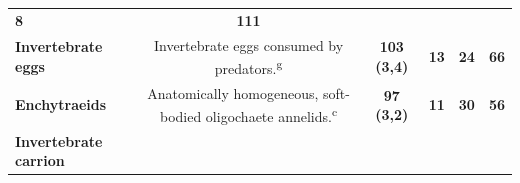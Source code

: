\documentclass[10pt,oneside]{article}
\begin{document}
\begin{longtable}[]{@{}lccccc@{}}
\begin{minipage}[t]{0.04\columnwidth}
\textbf{8}\strut
\end{minipage} & \begin{minipage}[t]{0.04\columnwidth}\centering
\textbf{111}\strut
\end{minipage}\tabularnewline
\begin{minipage}[t]{0.11\columnwidth}\raggedright
\textbf{Invertebrate eggs}\strut
\end{minipage} & \begin{minipage}[t]{0.45\columnwidth}\centering
Invertebrate eggs consumed by predators.\textsuperscript{g}\strut
\end{minipage} & \begin{minipage}[t]{0.14\columnwidth}\centering
\textbf{103 (3,4)}\strut
\end{minipage} & \begin{minipage}[t]{0.04\columnwidth}\centering
\textbf{13}\strut
\end{minipage} & \begin{minipage}[t]{0.04\columnwidth}\centering
\textbf{24}\strut
\end{minipage} & \begin{minipage}[t]{0.04\columnwidth}\centering
\textbf{66}\strut
\end{minipage}\tabularnewline
\begin{minipage}[t]{0.11\columnwidth}\raggedright
\textbf{Enchytraeids}\strut
\end{minipage} & \begin{minipage}[t]{0.45\columnwidth}\centering
Anatomically homogeneous, soft-bodied oligochaete
annelids.\textsuperscript{c}\strut
\end{minipage} & \begin{minipage}[t]{0.14\columnwidth}\centering
\textbf{97 (3,2)}\strut
\end{minipage} & \begin{minipage}[t]{0.04\columnwidth}\centering
\textbf{11}\strut
\end{minipage} & \begin{minipage}[t]{0.04\columnwidth}\centering
\textbf{30}\strut
\end{minipage} & \begin{minipage}[t]{0.04\columnwidth}\centering
\textbf{56}\strut
\end{minipage}\tabularnewline
\begin{minipage}[t]{0.11\columnwidth}\raggedright
\textbf{Invertebrate carrion}\strut
\end{minipage} & \begin{minipage}[t]{0.45\columnwidth}\centering

\end{minipage}
\end{longtable}
\end{document}
